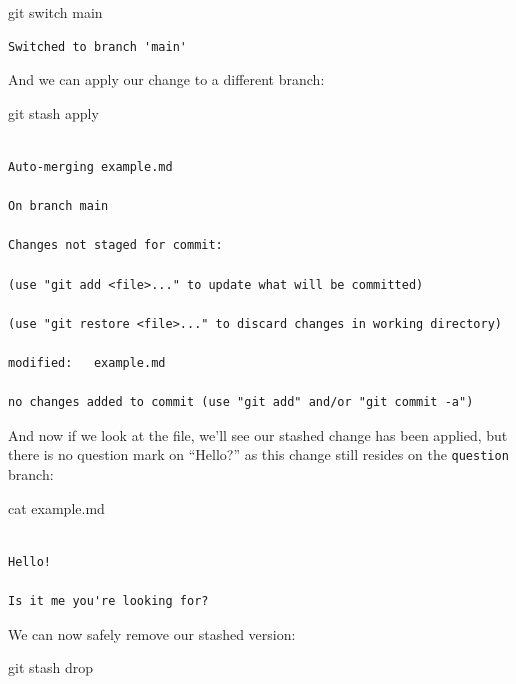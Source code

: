 \documentclass[
  letterpaper,
  DIV=11,
  numbers=noendperiod]{scrartcl}
\newenvironment{Shaded}{\begin{snugshade}}{\end{snugshade}}
\newcommand{\FunctionTok}[1]{\textcolor[rgb]{0.28,0.35,0.67}{#1}}
\newcommand{\NormalTok}[1]{\textcolor[rgb]{0.00,0.23,0.31}{#1}}
\begin{document}
\begin{Shaded}
\begin{Highlighting}[]
\FunctionTok{git}\NormalTok{ switch main}
\end{Highlighting}
\end{Shaded}

\begin{verbatim}
Switched to branch 'main'
\end{verbatim}

And we can apply our change to a different branch:

\begin{Shaded}
\begin{Highlighting}[]
\FunctionTok{git}\NormalTok{ stash apply}
\end{Highlighting}
\end{Shaded}

\begin{verbatim}

Auto-merging example.md

On branch main

Changes not staged for commit:

(use "git add <file>..." to update what will be committed)

(use "git restore <file>..." to discard changes in working directory)

modified:   example.md

no changes added to commit (use "git add" and/or "git commit -a")
\end{verbatim}

And now if we look at the file, we'll see our stashed change has been
applied, but there is no question mark on ``Hello?'' as this change
still resides on the \texttt{question} branch:

\begin{Shaded}
\begin{Highlighting}[]
\FunctionTok{cat}\NormalTok{ example.md}
\end{Highlighting}
\end{Shaded}

\begin{verbatim}

Hello!

Is it me you're looking for?
\end{verbatim}

We can now safely remove our stashed version:

\begin{Shaded}
\begin{Highlighting}[]
\FunctionTok{git}\NormalTok{ stash drop}
\end{Highlighting}
\end{Shaded}
\end{document}
